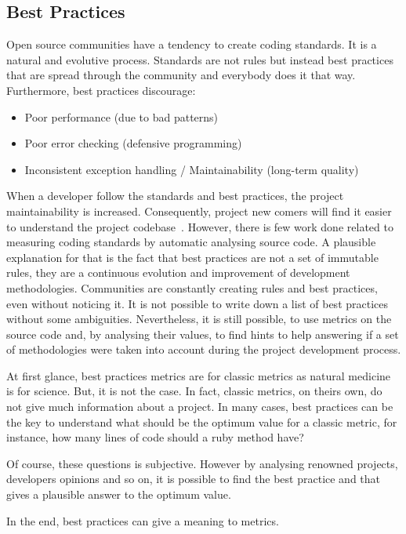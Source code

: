 \documentclass[sle]{llncs}
\begin{document}
\subsection{Best Practices}
Open source communities have a tendency to create coding standards. It is a natural and evolutive process. 
Standards are not rules but instead best practices that are spread through the community and everybody does it that way. 
Furthermore, best practices discourage:
\begin{itemize}
\item Poor performance (due to bad patterns)
\item Poor error checking (defensive programming)
\item Inconsistent exception handling / Maintainability (long-term quality)
\end{itemize}
When a developer follow the standards and best practices, the project maintainability is increased. Consequently, project new comers will find it easier to understand the project codebase~\cite{dromey2002model}.
However, there is few work done related to measuring coding standards by automatic analysing source code.
A plausible explanation for that is the fact that best practices are not a set of immutable rules, 
they are a continuous evolution and improvement of development methodologies.
Communities are constantly creating rules and best practices, even without noticing it. 
It is not possible to write down a list of best practices without some ambiguities. 
Nevertheless, it is still possible, to use metrics on the source code and, by analysing their values,
to find hints to help answering if a set of methodologies were taken into account during the project development process.

At first glance, best practices metrics are for classic metrics as natural medicine is for science. 
But, it is not the case.
In fact, classic metrics, on theirs own, do not give much information about a project.
In many cases, best practices can be the key to understand what should be the optimum value for a classic metric,
for instance, how many lines of code should a ruby method have? 

Of course, these questions is subjective.  
However by analysing renowned projects, developers opinions and so on, it is possible to find the best practice
and that gives a plausible answer to the optimum value.

In the end, best practices can give a meaning to metrics.


\end{document}
